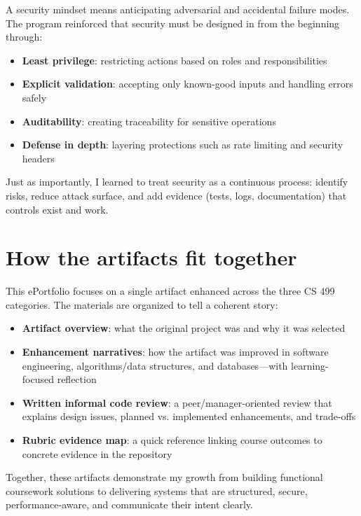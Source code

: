 \documentclass[12pt,stu]{apa7}
\begin{document}
A security mindset means anticipating adversarial and accidental failure modes. The program reinforced that security must be designed in from the beginning through:

\begin{itemize}
  \item \textbf{Least privilege}: restricting actions based on roles and responsibilities
  \item \textbf{Explicit validation}: accepting only known-good inputs and handling errors safely
  \item \textbf{Auditability}: creating traceability for sensitive operations
  \item \textbf{Defense in depth}: layering protections such as rate limiting and security headers
\end{itemize}

Just as importantly, I learned to treat security as a continuous process: identify risks, reduce attack surface, and add evidence (tests, logs, documentation) that controls exist and work.

\section*{How the artifacts fit together}

This ePortfolio focuses on a single artifact enhanced across the three CS 499 categories. The materials are organized to tell a coherent story:

\begin{itemize}
  \item \textbf{Artifact overview}: what the original project was and why it was selected
  \item \textbf{Enhancement narratives}: how the artifact was improved in software engineering, algorithms/data structures, and databases---with learning-focused reflection
  \item \textbf{Written informal code review}: a peer/manager-oriented review that explains design issues, planned vs. implemented enhancements, and trade-offs
  \item \textbf{Rubric evidence map}: a quick reference linking course outcomes to concrete evidence in the repository
\end{itemize}

Together, these artifacts demonstrate my growth from building functional coursework solutions to delivering systems that are structured, secure, performance-aware, and communicate their intent clearly.
\end{document}
